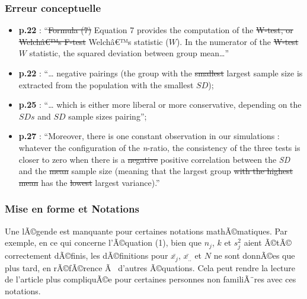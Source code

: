 \begin{appendix}
\hypertarget{erreur-conceptuelle}{%
\subsubsection{Erreur conceptuelle}\label{erreur-conceptuelle}}

\begin{itemize}
\tightlist
\item
  \textbf{p.22} : ``\sout{Formula (7)} \color{blue}Equation 7
  \color{black} provides the computation of the \sout{W-test, or
  Welchâ€™s F-test} \color{blue}Welchâ€™s statistic (\(W\)).
  \color{black} In the numerator of the \sout{W-test} \color{blue}\(W\)
  statistic,\color{black} the squared deviation between group
  mean\ldots{}''
\item
  \textbf{p.22} : ``\ldots{} negative pairings (the group with the
  \sout{smallest} \color{blue}largest \color{black} sample size is
  extracted from the population with the smallest \(SD\));
\item
  \textbf{p.25} : ``\ldots{} which is either more liberal or more
  conservative, depending on the \(SDs\) and \sout{\(SD\)}
  \color{blue}sample sizes \color{black} pairing'';
\item
  \textbf{p.27} : ``Moreover, there is one constant observation in our
  simulations : whatever the configuration of the \emph{n}-ratio, the
  consistency of the three tests is closer to zero when there is a
  \sout{negative} \color{blue}positive \color{black} correlation between
  the \emph{SD} and the \sout{mean} \color{blue}sample size
  \color{black} (meaning that the \color{blue}largest \color{black}
  group \sout{with the highest mean} has the \sout{lowest}
  \color{blue}largest \color{black} variance).''
\end{itemize}

\hypertarget{mise-en-forme-et-notations-1}{%
\subsubsection{Mise en forme et
Notations}\label{mise-en-forme-et-notations-1}}

Une lÃ©gende est manquante pour certaines notations mathÃ©matiques. Par
exemple, en ce qui concerne l'Ã©quation (1), bien que \(n_j\), \(k\) et
\(s^2_j\) aient Ã©tÃ© correctement dÃ©finis, les dÃ©finitions pour
\(\bar{x_j}\), \(\bar{x_{..}}\) et \(N\) ne sont donnÃ©es que plus tard,
en rÃ©fÃ©rence Ã~ d'autres Ã©quations. Cela peut rendre la lecture de
l'article plus compliquÃ©e pour certaines personnes non familiÃ¨res avec
ces notations.


\end{appendix}
